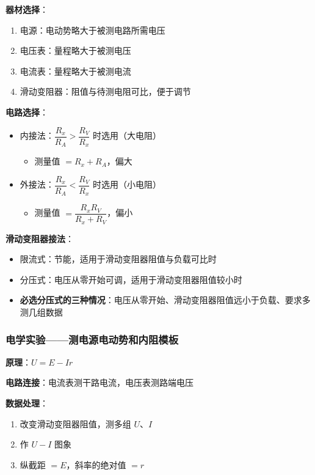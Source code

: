 \textbf{器材选择}：
\begin{enumerate}
  \item 电源：电动势略大于被测电路所需电压
  \item 电压表：量程略大于被测电压
  \item 电流表：量程略大于被测电流
  \item 滑动变阻器：阻值与待测电阻可比，便于调节
\end{enumerate}

\textbf{电路选择}：
\begin{itemize}
  \item 内接法：$\dfrac{R_x}{R_A} > \dfrac{R_V}{R_x}$ 时选用（大电阻）
    \begin{itemize}
      \item 测量值 $= R_x + R_A$，偏大
    \end{itemize}
  \item 外接法：$\dfrac{R_x}{R_A} < \dfrac{R_V}{R_x}$ 时选用（小电阻）
    \begin{itemize}
      \item 测量值 $= \dfrac{R_xR_V}{R_x+R_V}$，偏小
    \end{itemize}
\end{itemize}

\textbf{滑动变阻器接法}：
\begin{itemize}
  \item 限流式：节能，适用于滑动变阻器阻值与负载可比时
  \item 分压式：电压从零开始可调，适用于滑动变阻器阻值较小时
  \item \textbf{必选分压式的三种情况}：电压从零开始、滑动变阻器阻值远小于负载、要求多测几组数据
\end{itemize}

\subsubsection{电学实验——测电源电动势和内阻模板}

\textbf{原理}：$U = E - Ir$

\textbf{电路连接}：电流表测干路电流，电压表测路端电压

\textbf{数据处理}：
\begin{enumerate}
  \item 改变滑动变阻器阻值，测多组 $U$、$I$
  \item 作 $U-I$ 图象
  \item 纵截距 $= E$，斜率的绝对值 $= r$
\end{enumerate}

